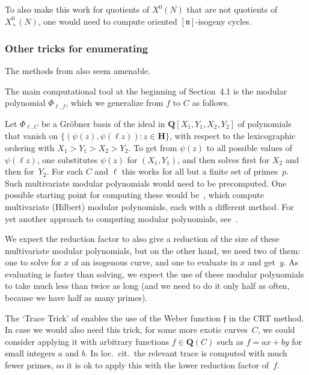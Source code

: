 \documentclass{amsart}
\newcommand{\QQ}{\mathbf{Q}}
\newcommand{\HH}{\mathbf{H}}
\newcommand{\xnul}[1]{X^0(#1)}
\newcommand{\xnulN}{\xnul{N}}
\newcommand{\xplus}[1]{X^0_+(#1)}
\newcommand{\xplusN}{\xplus{N}}
\numberwithin{equation}{section}
\theoremstyle{definition}
\begin{document}
    To also make this work for quotients of $\xnulN$ that are not quotients of $\xplusN$,
    one would need to compute oriented $[\mathfrak{n}]$-isogeny cycles.
    
\subsubsection{Other tricks for enumerating}
The methods from \cite[Sections 4.1 and~4.2]{enge-sutherland2010} also
seem amenable.
    
    The main computational tool at the beginning of Section~4.1 is the modular polynomial $\Phi_{\ell,f}$,
    which we generalize from $f$ to $C$ as follows.
    
    Let $\Phi_{\ell,C}$ be a Gr\"obner basis
    of the ideal in $\QQ[X_1,Y_1,X_2,Y_2]$ of polynomials that vanish
    on $\{(\psi(z),\psi(\ell z)) : z\in\HH\}$,
    with respect to the lexicographic ordering with $X_1>Y_1>X_2>Y_2$.
    To get from $\psi(z)$ to all possible values of $\psi(\ell z)$,
    one substitutes $\psi(z)$ for $(X_1,Y_1)$, and then solves first for
    $X_2$ and then for~$Y_2$.
    For each $C$ and $\ell$ this works for all but a finite set of primes~$p$.
    Such multivariate modular polynomials would need to be precomputed.
    One possible starting point for computing these would be~\cite{martindale2020,milio-robert2020},
    which compute multivariate (Hilbert) modular polynomials,
    each with a different method. For yet another approach to computing
    modular polynomials, see~\cite{broker-lauter-sutherland2012}.

    We expect the reduction factor to also give a reduction of the size of
    these multivariate modular polynomials, but on the other hand, we need two of them:
    one to solve for $x$ of an isogenous curve,
    and one to evaluate in $x$ and get~$y$.
    As evaluating is faster than solving, we expect the use of these modular polynomials to take much less
    than twice as long (and we need to do it only half as often, because we have half as many primes).

The `Trace Trick' of \cite[Section~4.2]{enge-sutherland2010} enables the use of the Weber function $\mathfrak{f}$
in the CRT method. In case we would also need this trick, for some more exotic
curves~$C$, we could consider applying it with arbitrary
functions $f\in \QQ(C)$ such as $f = ax+by$ for small integers $a$ and $b$.
In loc.~cit.\ the relevant trace is computed with much fewer primes,
so it is ok to apply this with the lower reduction factor of~$f$.
\end{document}

